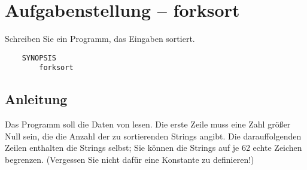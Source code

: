 




\section*{Aufgabenstellung -- forksort}
Schreiben Sie ein Programm, das Eingaben sortiert.
\begin{verbatim}
    SYNOPSIS
        forksort
\end{verbatim}

\subsection*{Anleitung}
Das Programm soll die Daten von  lesen. Die erste Zeile muss
eine Zahl größer Null sein, die die Anzahl der zu sortierenden Strings angibt.
Die darauffolgenden Zeilen enthalten die Strings selbst; Sie können die
Strings auf je 62 echte Zeichen begrenzen. (Vergessen Sie nicht dafür eine
Konstante zu definieren!)

